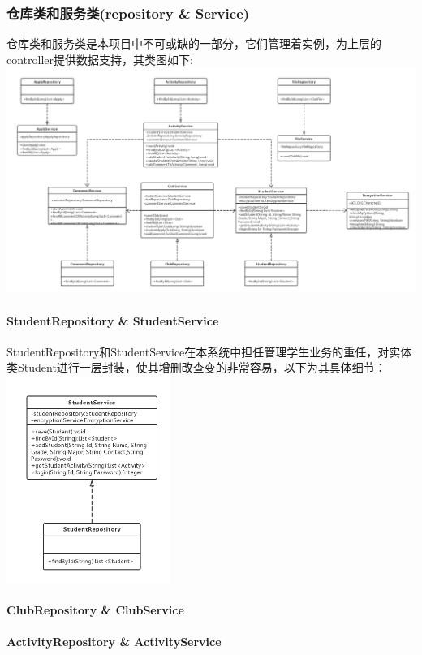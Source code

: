 \documentclass[UTF8]{ctexart}
\begin{document}
\subsubsection{仓库类和服务类(repository \& Service)}
仓库类和服务类是本项目中不可或缺的一部分，它们管理着实例，为上层的controller提供数据支持，其类图如下:
\newline
\includegraphics[width = 1.1\textwidth]{repository-service.png}

\paragraph{StudentRepository \& StudentService}
StudentRepository和StudentService在本系统中担任管理学生业务的重任，对实体类Student进行一层封装，使其增删改查变的非常容易，以下为其具体细节：
\newline
\includegraphics[width = 0.4\textwidth]{student-rs.png}
\newline
\paragraph{ClubRepository \& ClubService}
\paragraph{ActivityRepository \& ActivityService}
\end{document}
